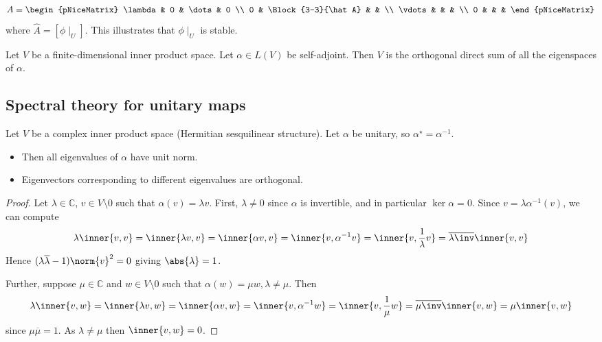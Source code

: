 \begin{remark}
	\begin{align*}
		A = \begin{pNiceMatrix}
		\lambda & 0 & \dots & 0 \\
		0 		& \Block{3-3}{\hat A} &  &  \\
		\vdots  &  &  &  \\
		0 		&  &  & 
		\end{pNiceMatrix}
	\end{align*} where $\hat A = [\phi \mid_U]$. 
	This illustrates that $\phi \mid_U$ is stable.
\end{remark} 

\begin{corollary}
	Let $V$ be a finite-dimensional inner product space.
	Let $\alpha \in L(V)$ be self-adjoint.
	Then $V$ is the orthogonal direct sum of all the eigenspaces of $\alpha$.
\end{corollary}

\subsection{Spectral theory for unitary maps}
\begin{lemma}
	Let $V$ be a complex inner product space (Hermitian sesquilinear structure).
	Let $\alpha$ be unitary, so $\alpha^\star = \alpha^{-1}$.
	\begin{itemize}
		\item Then all eigenvalues of $\alpha$ have unit norm.
		\item Eigenvectors corresponding to different eigenvalues are orthogonal.
	\end{itemize} 
\end{lemma}
\begin{proof}
	Let $\lambda \in \mathbb C$, $v \in V \setminus \qty{0}$ such that $\alpha(v) = \lambda v$.
	First, $\lambda \neq 0$ since $\alpha$ is invertible, and in particular $\ker \alpha = \qty{0}$.
	Since $v = \lambda \alpha^{-1}(v)$, we can compute
	\begin{align*}
		\lambda \inner{v,v} = \inner{\lambda v, v} = \inner{\alpha v, v} = \inner{v, \alpha^{-1} v} = \inner{v, \frac{1}{\lambda} v} = \overline{\lambda\inv} \inner{v, v}
	\end{align*}
	Hence $(\lambda \overline \lambda - 1) \norm{v}^2 = 0$ giving $\abs{\lambda} = 1$.

	Further, suppose $\mu \in \mathbb C$ and $w \in V \setminus \qty{0}$ such that $\alpha(w) = \mu w, \lambda \neq \mu$.
	Then
	\begin{align*}
		\lambda \inner{v,w} = \inner{\lambda v, w} = \inner{\alpha v, w} = \inner{v, \alpha^{-1} w} = \inner{v, \frac{1}{\mu} w} = \overline{\mu\inv} \inner{v,w} = \mu \inner{v,w}
	\end{align*}
	since $\mu \overline \mu = 1$.
	As $\lambda \neq \mu$ then $\inner{v, w} = 0$.
\end{proof}

